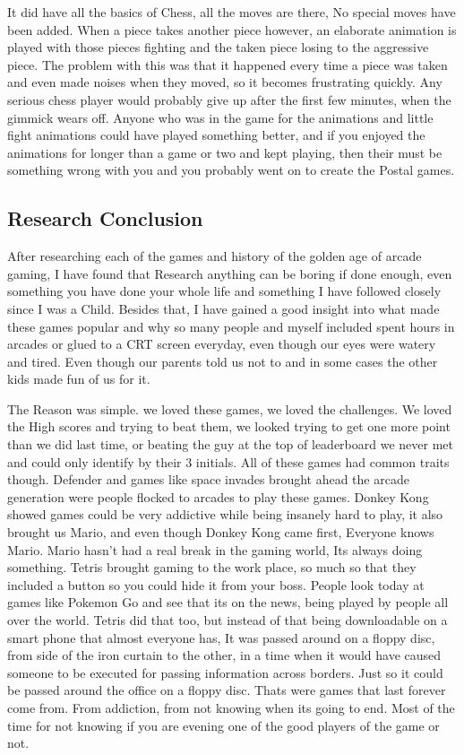 \documentclass{article}
\begin{document}
It did have all the basics of Chess, all the moves are there, No special moves have been added. When a piece takes another piece however, an elaborate animation is played with those pieces fighting and the taken piece losing to the aggressive piece. The problem with this was that it happened every time a piece was taken and even made noises when they moved, so it becomes frustrating quickly. Any serious chess player would probably give up after the first few minutes, when the gimmick wears off. Anyone who was in the game for the animations and little fight animations could have played something better, and if you enjoyed the animations for longer than a game or two and kept playing, then their  must be something wrong with you and you probably went on to create the Postal games. \newline

\subsection{Research Conclusion}
After researching each of the games and history of the golden age of arcade gaming, I have found that Research anything can be boring if done enough, even something you have done your whole life and something I have followed closely since I was a Child. Besides that, I have gained a good insight into what made these games popular and why so many people and myself included spent hours in arcades or glued to a CRT screen everyday, even though our eyes were watery and tired. Even though our parents told us not to and in some cases the other kids made fun of us for it. \newline

The Reason was simple. we loved these games, we loved the challenges. We loved the High scores and trying to beat them, we looked trying to get one more point than we did last time, or beating the guy at the top of leaderboard we never met and could only identify by their 3 initials. All of these games had common traits though. Defender and games like space invades brought ahead the arcade generation were people flocked to arcades to play these games. Donkey Kong showed games could be very addictive while being insanely hard to play, it also brought us Mario, and even though Donkey Kong came first, Everyone knows Mario. Mario hasn't had a real break in the gaming world, Its always doing something. Tetris brought gaming to the work place, so much so that they included a button so you could hide it from your boss. People look today at games like Pokemon Go and see that its on the news, being played by people all over the world. Tetris did that too, but instead of that being downloadable on a smart phone that almost everyone has, It was passed around on a floppy disc, from side of the iron curtain to the other, in a time when it would have caused someone to be executed for passing information across borders. Just so it could be passed around the office on a floppy disc. Thats were games that last forever come from. From addiction, from not knowing when its going to end. Most of the  time for not knowing if you are evening one of the good players of the game or not. 
\end{document}
